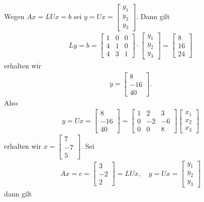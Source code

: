 \documentclass[fleqn,draft,a5paper]{article}
\theoremstyle{remark}
\begin{document}
  Wegen \(Ax = LUx = b\) sei \(y = Ux =
  \begin{bmatrix}
    y_{1} \\ y _{2} \\ y_{3}
  \end{bmatrix}
  \).  Dann gilt
  \begin{align*}
    Ly = b =
    \begin{bmatrix}
      1 & 0 & 0 \\ 4&1&0 \\ 4&3&1
    \end{bmatrix}\cdot
    \begin{bmatrix}
      y_{1} \\ y_{2} \\ y_{3}
    \end{bmatrix}
    =
    \begin{bmatrix}
      8 \\ 16 \\ 24
    \end{bmatrix}
  \end{align*}
  erhalten wir
  \begin{align*}
    y =
    \begin{bmatrix}
      8 \\ -16 \\ 40
    \end{bmatrix}.
  \end{align*}
  Also
  \begin{align*}
    y = Ux =
    \begin{bmatrix}
      8 \\ -16 \\ 40
    \end{bmatrix}
    =
    \begin{bmatrix}
      1 & 2 & 3 \\ 0&-2&-6\\0&0&8
    \end{bmatrix}
    \begin{bmatrix}
      x_{1}\\ x_{2} \\ x_{3}
    \end{bmatrix}
  \end{align*}
  erhalten wir \(x =
  \begin{bmatrix}
    7 \\ -7 \\ 5
  \end{bmatrix}.
  \)  Sei
  \begin{align*}
    Ax = c =
    \begin{bmatrix}
      3 \\ -2 \\ 2
    \end{bmatrix}
    = LUx, \quad y = Ux =
    \begin{bmatrix}
      y_{1} \\ y_{2} \\ y_{3}
    \end{bmatrix}
  \end{align*} dann gilt
\end{document}
